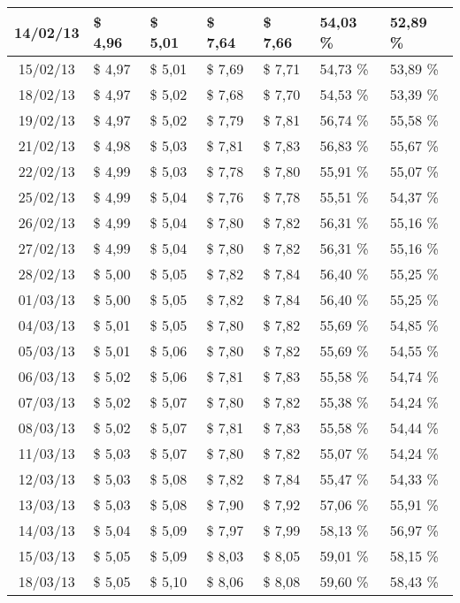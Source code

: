 \begin{center}
\begin{longtable}{|c|p{1.5cm}|p{1.5cm}|p{1.5cm}|p{1.5cm}|p{1.5cm}|p{1.5cm}|}
14/02/13 & \$ 4,96 & \$ 5,01 & \$ 7,64 & \$ 7,66 & 54,03 \% & 52,89 \% \\ \hline
15/02/13 & \$ 4,97 & \$ 5,01 & \$ 7,69 & \$ 7,71 & 54,73 \% & 53,89 \% \\ \hline
18/02/13 & \$ 4,97 & \$ 5,02 & \$ 7,68 & \$ 7,70 & 54,53 \% & 53,39 \% \\ \hline
19/02/13 & \$ 4,97 & \$ 5,02 & \$ 7,79 & \$ 7,81 & 56,74 \% & 55,58 \% \\ \hline
21/02/13 & \$ 4,98 & \$ 5,03 & \$ 7,81 & \$ 7,83 & 56,83 \% & 55,67 \% \\ \hline
22/02/13 & \$ 4,99 & \$ 5,03 & \$ 7,78 & \$ 7,80 & 55,91 \% & 55,07 \% \\ \hline
25/02/13 & \$ 4,99 & \$ 5,04 & \$ 7,76 & \$ 7,78 & 55,51 \% & 54,37 \% \\ \hline
26/02/13 & \$ 4,99 & \$ 5,04 & \$ 7,80 & \$ 7,82 & 56,31 \% & 55,16 \% \\ \hline
27/02/13 & \$ 4,99 & \$ 5,04 & \$ 7,80 & \$ 7,82 & 56,31 \% & 55,16 \% \\ \hline
28/02/13 & \$ 5,00 & \$ 5,05 & \$ 7,82 & \$ 7,84 & 56,40 \% & 55,25 \% \\ \hline
01/03/13 & \$ 5,00 & \$ 5,05 & \$ 7,82 & \$ 7,84 & 56,40 \% & 55,25 \% \\ \hline
04/03/13 & \$ 5,01 & \$ 5,05 & \$ 7,80 & \$ 7,82 & 55,69 \% & 54,85 \% \\ \hline
05/03/13 & \$ 5,01 & \$ 5,06 & \$ 7,80 & \$ 7,82 & 55,69 \% & 54,55 \% \\ \hline
06/03/13 & \$ 5,02 & \$ 5,06 & \$ 7,81 & \$ 7,83 & 55,58 \% & 54,74 \% \\ \hline
07/03/13 & \$ 5,02 & \$ 5,07 & \$ 7,80 & \$ 7,82 & 55,38 \% & 54,24 \% \\ \hline
08/03/13 & \$ 5,02 & \$ 5,07 & \$ 7,81 & \$ 7,83 & 55,58 \% & 54,44 \% \\ \hline
11/03/13 & \$ 5,03 & \$ 5,07 & \$ 7,80 & \$ 7,82 & 55,07 \% & 54,24 \% \\ \hline
12/03/13 & \$ 5,03 & \$ 5,08 & \$ 7,82 & \$ 7,84 & 55,47 \% & 54,33 \% \\ \hline
13/03/13 & \$ 5,03 & \$ 5,08 & \$ 7,90 & \$ 7,92 & 57,06 \% & 55,91 \% \\ \hline
14/03/13 & \$ 5,04 & \$ 5,09 & \$ 7,97 & \$ 7,99 & 58,13 \% & 56,97 \% \\ \hline
15/03/13 & \$ 5,05 & \$ 5,09 & \$ 8,03 & \$ 8,05 & 59,01 \% & 58,15 \% \\ \hline
18/03/13 & \$ 5,05 & \$ 5,10 & \$ 8,06 & \$ 8,08 & 59,60 \% & 58,43 \% \\ \hline

\end{longtable}
\end{center}
